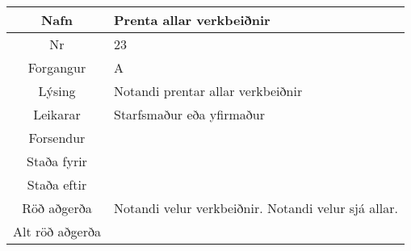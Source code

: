 \documentclass[a4paper]{article}
\begin{document}
\begin{tabular}{|c|p{10cm}|}
\hline
Nafn&Prenta allar verkbeiðnir\\
\hline
Nr&23\\
\hline
Forgangur&A\\
\hline
Lýsing&Notandi prentar allar verkbeiðnir\\
\hline
Leikarar&Starfsmaður eða yfirmaður\\
\hline
Forsendur&\\
\hline
Staða fyrir&\\
\hline
Staða eftir&\\
\hline
Röð aðgerða&Notandi velur verkbeiðnir. Notandi velur sjá allar.\\
\hline
Alt röð aðgerða&\\
\hline
\end{tabular}
\end{document}
